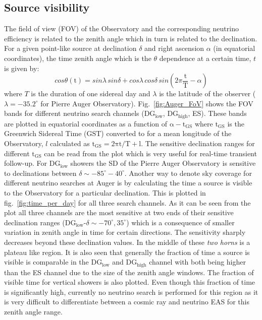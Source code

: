 \subsection{Source visibility}
\label{subsec:psource_coverage}
The field of view (FOV) of the Observatory and the corresponding neutrino efficiency is related to the zenith angle which in turn is related to the declination. For a given point-like source at declination $\delta$ and right ascension $\alpha$ (in equatorial coordinates), the time zenith angle which is the $\theta$ dependence at a certain time, $t$ is given by:
\begin{equation}
  \label{eq:zenith_angle_time}
  cos \theta(\text{t}) = sin \lambda \,sin \delta+ cos \lambda \, cos \delta \,sin (2\pi \frac{\text{t}}{\text{T}} - \alpha)
\end{equation} 
where $T$ is the duration of one sidereal day and $\lambda$ is the latitude of the observer ($\lambda = -35.2^{\circ}$ for Pierre Auger Observatory). 
Fig.~\ref{fig:Auger_FoV} shows the FOV bands for different neutrino search channels (DG$\mathrm{_{\text{low}}}$, DG$\mathrm{_{\text{high}}}$, ES). These bands are plotted in equatorial coordinates as a function of $\mathrm{\alpha - t _{GS}}$ where $\mathrm{t_{GS}}$ is the Greenwich Sidereal Time (GST) converted to for a mean longitude of the Observatory, $l$ calculated as $\mathrm{t_{GS}= 2\pi t/T + l}$. The sensitive declination ranges for different $\mathrm{t_{GS}}$ can be read from the plot which is very useful for real-time transient follow-up. For DG$\mathrm{_{\text{low}}}$ showers the SD of the Pierre Auger Observatory is sensitive to declinations between $\delta \sim -85^{\circ} - 40^{\circ}$. Another way to denote sky coverage for different neutrino searches at Auger is by calculating the time a source is visible to the Observatory for a particular declination. This is plotted in fig.~\ref{fig:time_per_day} for all three search channels. As it can be seen from the plot all three channels are the most sensitive at two ends of their sensitive declination ranges (DG$\mathrm{_{\text{low}}}$-$\delta \sim -70^{\circ}, 35^{\circ}$) which is a consequence of smaller variation in zenith angle in time for certain directions. The sensitivity sharply decreases beyond these declination values. In the middle of these \textit{two horns} is a plateau like region. It is also seen that generally the fraction of time a source is visible is comparable in the DG$\mathrm{_{\text{low}}}$ and DG$\mathrm{_{\text{high}}}$ channel with both being higher than the ES channel due to the size of the zenith angle windows. The fraction of visible time for vertical showers is also plotted. Even though this fraction of time is significantly high, currently no neutrino search is performed for this region as it is very difficult to differentiate between a cosmic ray and neutrino EAS for this zenith angle range.

